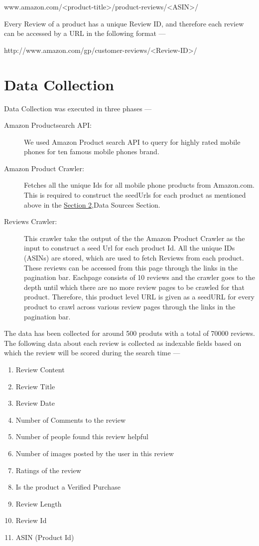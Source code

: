 \documentclass{article}
\begin{document}
\begin{center}
\label{sec:urlPattern}
	www.amazon.com/<product-title>/product-reviews/<ASIN>/
\end{center}

Every Review of a product has a unique Review ID, and therefore each review can be accessed by a URL in the following format ---
\begin{center}
	http://www.amazon.com/gp/customer-reviews/<Review-ID>/
\end{center}

\section{Data Collection}

Data Collection was executed in three phases ---

\begin{description}
  \item[Amazon Productsearch API:] We used Amazon Product search API to query for highly rated mobile phones for ten famous mobile phones brand.
	\item[Amazon Product Crawler:] Fetches all the unique Ids for all mobile phone products from Amazon.com. This is required to construct the seedUrls for each product as mentioned above in the \hyperref[sec:dataSources]{Section 2},Data Sources Section.
	\item[Reviews Crawler:] This crawler take the output of the the Amazon Product Crawler as the input to construct a seed Url for each product Id. All the unique IDs (ASINs) are stored, which are used to fetch Reviews from each product. These reviews can be accessed from this page through the links in the pagination bar. Eachpage consists of 10 reviews and the crawler goes to the depth until which there are no more review pages to be crawled for that product. Therefore, this product level URL is given as a seedURL for every product to crawl across various review pages through the links in the pagination bar.
\end{description}

The data has been collected for around 500 produts with a total of 70000 reviews. The following data about each review is collected as indexable fields based on which the review will be scored during the search time ---

\begin{enumerate}
	\item Review Content
	\item Review Title
	\item Review Date
	\item Number of Comments to the review
	\item Number of people found this review helpful
	\item Number of images posted by the user in this review
	\item Ratings of the review 
	\item Is the product a Verified Purchase
	\item Review Length
	\item Review Id
	\item ASIN (Product Id)
\end{enumerate}
\end{document}

